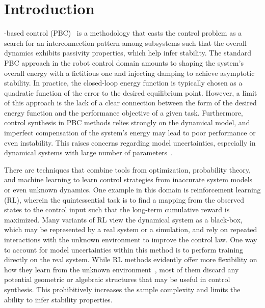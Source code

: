 \section{Introduction}


-based control (PBC)~\cite{ortega2001putting,van2000l2} is a
methodology that casts the control problem as a search for an interconnection
pattern among subsystems such that the overall dynamics exhibits passivity
properties, which help infer stability.
%
The standard PBC approach in the robot control domain amounts to shaping the
system's overall energy with a fictitious one and injecting damping to
achieve asymptotic stability.
%
In practice, the closed-loop energy function is typically chosen as a quadratic
function of the error to the desired equilibrium point.
%
However, a limit of this approach is the lack of a clear connection between the
form of the desired energy function and the performance objective of a given
task.
%
Furthermore, control synthesis in PBC methods relies strongly on the dynamical
model, and imperfect compensation of the system's energy may lead to poor
performance or even instability.
%
This raises concerns regarding model uncertainties, especially in dynamical
systems with large number of parameters~\cite{nagy,wu2020active}.
%
%


There are techniques that combine tools from optimization, probability theory,
and machine learning to learn control strategies from inaccurate system models
or even unknown dynamics.
%
%
%
One example in this domain is reinforcement learning (RL), wherein the quintessential
task is to find a mapping from the observed states to the control input such
that the long-term cumulative reward is maximized.
%
Many variants of RL view the dynamical system as a black-box, which may be
represented by a real system or a simulation, and rely on repeated interactions
with the unknown environment to improve the control law.
%
One way to account for model uncertainties within this method is to perform training
directly on the real system.
%
%
While RL methods evidently offer more flexibility on how they learn from the
unknown environment~\cite{heess2017emergence, andrychowicz2020learning,
lillicrap2015continuous}, most of them discard any potential geometric or
algebraic structures that may be useful in control synthesis.
%
This prohibitively increases the sample complexity and limits the ability to
infer stability properties.


